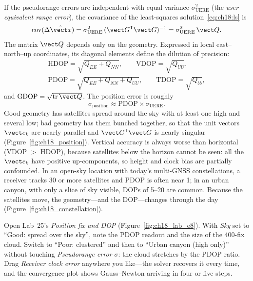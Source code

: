 If the pseudorange errors are independent with equal variance $\sigma_{\text{UERE}}^2$ (the
\emph{user equivalent range error}), the covariance of the least-squares
solution~\eqref{eq:ch18:ls} is
\begin{equation}
\operatorname{cov}(\Delta\hat{\vect x})=\sigma_{\text{UERE}}^2\,(\vect G^{\mathsf T}\vect G)^{-1}=\sigma_{\text{UERE}}^2\,\vect Q.
\end{equation}
The matrix $\vect Q$ depends only on the geometry. Expressed in local east--north--up
coordinates, its diagonal elements define the dilution of precision:
\begin{equation}
\begin{gathered}
\text{HDOP}=\sqrt{Q_{EE}+Q_{NN}},\qquad\text{VDOP}=\sqrt{Q_{UU}},\\
\text{PDOP}=\sqrt{Q_{EE}+Q_{NN}+Q_{UU}},\qquad\text{TDOP}=\sqrt{Q_{bb}},
\end{gathered}
\end{equation}
and $\text{GDOP}=\sqrt{\operatorname{tr}\vect Q}$. The position error is roughly
\begin{equation}
\sigma_{\text{position}}\approx\text{PDOP}\times\sigma_{\text{UERE}}.
\end{equation}
Good geometry has satellites spread around the sky with at least one high and several low;
bad geometry has them bunched together, so that the unit vectors $\vect e_k$ are nearly
parallel and $\vect G^{\mathsf T}\vect G$ is nearly singular (Figure~\ref{fig:ch18_position}).
Vertical accuracy is always worse than horizontal (VDOP $>$ HDOP), because satellites below
the horizon cannot be seen: all the $\vect e_k$ have positive up-components, so height and
clock bias are partially confounded. In an open-sky location with today's multi-GNSS
constellations, a receiver tracks 30 or more satellites and PDOP is often near 1; in an urban
canyon, with only a slice of sky visible, DOPs of 5--20 are common. Because the satellites move,
the geometry---and the DOP---changes through the day (Figure~\ref{fig:ch18_constellation}).


\begin{tryit}
Open Lab~25's \emph{Position fix and DOP} (Figure~\ref{fig:ch18_lab_e8}). With \emph{Sky} set to ``Good: spread over the sky'',
note the PDOP readout and the size of the 400-fix cloud. Switch to ``Poor: clustered'' and then to
``Urban canyon (high only)'' without touching \emph{Pseudorange error $\sigma$}: the cloud stretches
by the PDOP ratio. Drag \emph{Receiver clock error} anywhere you like---the solver recovers it every
time, and the convergence plot shows Gauss--Newton arriving in four or five steps.
\end{tryit}

